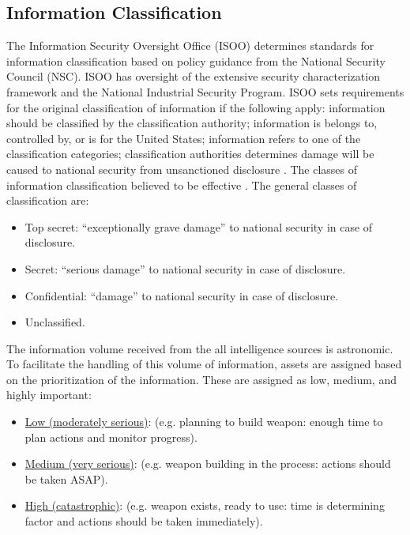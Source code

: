 \documentclass{report}
\begin{document}
\subsection{Information Classification}

The Information Security Oversight Office (ISOO) determines standards for information classification based on policy guidance from the National Security Council (NSC). ISOO has oversight of the extensive security characterization framework and the National Industrial Security Program. ISOO sets requirements for the original classification of information if the following apply: information should be classified by the classification authority; information is belongs to, controlled by, or is for the United States; information refers to one of the classification categories; classification authorities determines damage will be caused to national security from unsanctioned disclosure \cite{Office2010}. The classes of information classification believed to be effective \cite{Richelson2011,Office2010}.  The general classes of classification are:


\begin{itemize}
  \item Top secret: \enquote{exceptionally grave damage} to national security in case of disclosure.
  \item Secret: \enquote{serious damage} to national security in case of disclosure.
  \item Confidential: \enquote{damage} to national security in case of disclosure.
  \item Unclassified.
\end{itemize}

The information volume received from the all intelligence sources is astronomic. To facilitate the handling of this volume of information, assets are assigned based on the prioritization of the information. These are assigned as low, medium, and highly important:

\begin{itemize}
  \item \underline{Low (moderately serious)}: (e.g. planning to build weapon: enough time to plan actions and monitor progress).
  \item \underline{Medium (very serious)}: (e.g. weapon building in the process: actions should be taken ASAP).
  \item \underline{High (catastrophic)}: (e.g. weapon exists, ready to use: time is determining factor and actions should be taken immediately).
\end{itemize}
\end{document}
